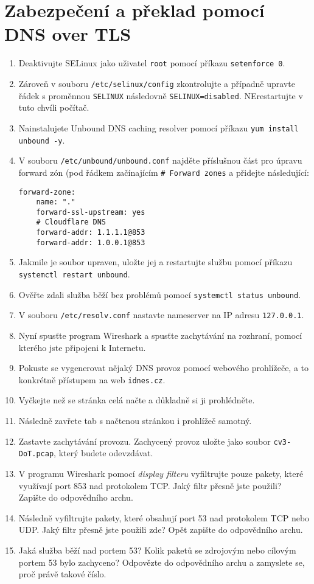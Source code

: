 \section{Zabezpečení a překlad pomocí DNS over TLS}
\label{sec:dot}
\begin{enumerate}
    \item Deaktivujte SELinux jako uživatel \texttt{root} pomocí příkazu \texttt{setenforce 0}.
	\item Zároveň v souboru \texttt{/etc/selinux/config} zkontrolujte a případně upravte řádek s proměnnou \texttt{SELINUX} následovně \texttt{SELINUX=disabled}. NErestartujte v tuto chvíli počítač.
    \item Nainstalujete Unbound DNS caching resolver pomocí příkazu \texttt{yum install unbound -y}.
    \item V souboru \texttt{/etc/unbound/unbound.conf} najděte příslušnou část pro úpravu forward zón (pod řádkem začínajícím \texttt{\# Forward zones} a přidejte následující:
    
\begin{verbatim}
forward-zone:
    name: "."
    forward-ssl-upstream: yes
    # Cloudflare DNS
    forward-addr: 1.1.1.1@853
    forward-addr: 1.0.0.1@853
\end{verbatim}

    \item Jakmile je soubor upraven, uložte jej a restartujte službu pomocí příkazu \texttt{systemctl restart unbound}.
    \item Ověřte zdali služba běží bez problémů pomocí \texttt{systemctl status unbound}.
    \item V souboru \texttt{/etc/resolv.conf} nastavte nameserver na IP adresu \texttt{127.0.0.1}.
    \item Nyní spusťte program Wireshark a spusťte zachytávání na rozhraní, pomocí kterého jste připojeni k Internetu.
    \item Pokuste se vygenerovat nějaký DNS provoz pomocí webového prohlížeče, a to konkrétně přístupem na web \texttt{idnes.cz}.
    \item Vyčkejte než se stránka celá načte a důkladně si ji prohlédněte.
    \item Následně zavřete tab s načtenou stránkou i prohlížeč samotný.
    \item Zastavte zachytávání provozu. Zachycený provoz uložte jako soubor \texttt{cv3-DoT.pcap}, který budete odevzdávat.
    \item V programu Wireshark pomocí \emph{display filteru} vyfiltrujte pouze pakety, které využívají port 853 nad protokolem TCP. Jaký filtr přesně jste použili? Zapište do odpovědního archu.
    \item Následně vyfiltrujte pakety, které obsahují port 53 nad protokolem TCP nebo UDP. Jaký filtr přesně jste použili zde? Opět zapište do odpovědního archu.
	\item Jaká služba běží nad portem 53? Kolik paketů se zdrojovým nebo cílovým portem 53 bylo zachyceno? Odpovězte do odpovědního archu a zamyslete se, proč právě takové číslo.
\end{enumerate}


